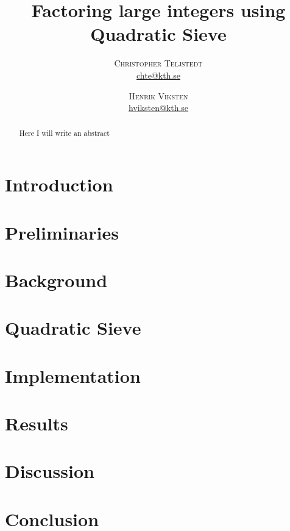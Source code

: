 \documentclass[twoside,11pt,english]{article}
\title{\vspace{-15mm}%
	\fontsize{24pt}{10pt}\selectfont
	\textbf{Factoring large integers using Quadratic Sieve}
	}
\author{%
	\large
	\textsc{Christopher Teljstedt} \\[2mm]
	\normalsize	\href{mailto:chte@kth.se}{chte@kth.se} 
	\and
	\textsc{Henrik Viksten} \\[2mm]
	\normalsize	\href{mailto:hviksten@kth.se}{hviksten@kth.se}
	}
\begin{document}
\maketitle
\thispagestyle{fancy}
\begin{abstract}
\noindent Here I will write an abstract
\end{abstract}
\newpage

\tableofcontents
\newpage
	

\begin{multicols}{2}
\section{Introduction}

\section{Preliminaries}

\newpage
\section{Background}

\newpage
\section{Quadratic Sieve}

\newpage
\section{Implementation}

\newpage
\section{Results}

\newpage
\section{Discussion}

\newpage
\section{Conclusion}


\newpage


\end{multicols}
\end{document}
